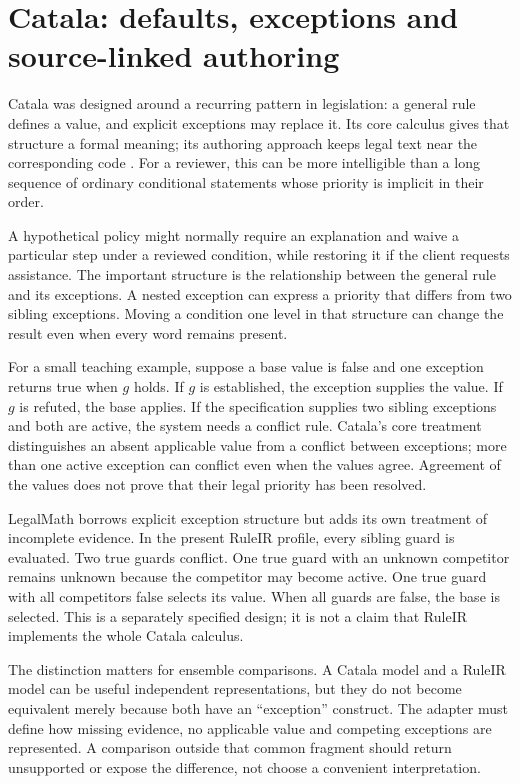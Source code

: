 \documentclass[12pt,a4paper,oneside,openany]{book}
\begin{document}
\section{Catala: defaults, exceptions and source-linked authoring}
\label{merge:M04:03}

\label{sec:languages-catala}
Catala was designed around a recurring pattern in legislation: a general rule
defines a value, and explicit exceptions may replace it. Its core calculus
gives that structure a formal meaning; its authoring approach keeps legal text
near the corresponding code \citep[secs.~2--4]{catala2021}. For a reviewer,
this can be more intelligible than a long sequence of ordinary conditional
statements whose priority is implicit in their order.

A hypothetical policy might normally require an explanation and waive a
particular step under a reviewed condition, while restoring it if the client
requests assistance. The important structure is the relationship between
the general rule and its exceptions. A nested exception can express a priority
that differs from two sibling exceptions. Moving a condition one level in
that structure can change the result even when every word remains present.

For a small teaching example, suppose a base value is false and one exception
returns true when $g$ holds. If $g$ is established, the exception supplies the
value. If $g$ is refuted, the base applies. If the specification supplies two
sibling exceptions and both are active, the system needs a conflict rule.
Catala's core treatment distinguishes an absent applicable value from a
conflict between exceptions; more than one active exception can conflict even
when the values agree. Agreement of the values does not prove that their
legal priority has been resolved.

LegalMath borrows explicit exception structure but adds its own treatment of
incomplete evidence. In the present RuleIR profile, every sibling guard is
evaluated. Two true guards conflict. One true guard with an unknown competitor
remains unknown because the competitor may become active. One true guard with
all competitors false selects its value. When all guards are false, the base
is selected. This is a separately specified design; it is not a claim that
RuleIR implements the whole Catala calculus.

The distinction matters for ensemble comparisons. A Catala model and a RuleIR
model can be useful independent representations, but they do not become
equivalent merely because both have an ``exception'' construct. The adapter
must define how missing evidence, no applicable value and competing exceptions
are represented. A comparison outside that common fragment should return
unsupported or expose the difference, not choose a convenient interpretation.
\end{document}
